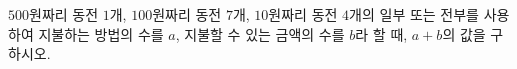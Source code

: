 $500$원짜리 동전 $1$개, $100$원짜리 동전 $7$개, $10$원짜리 동전 $4$개의 일부 또는 전부를 사용하여 지불하는 방법의 수를 $a$, 지불할 수 있는 금액의 수를 $b$라 할 때, $a+b$의 값을 구하시오. 
